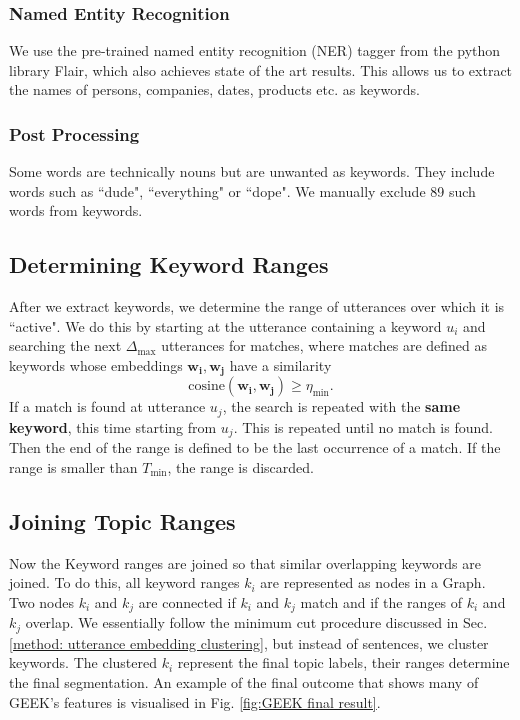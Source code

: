         \subsubsection{Named Entity Recognition}
            We use the pre-trained named entity recognition (NER) tagger from the python library Flair\cite{flairNLP}, which also achieves state of the art results. This allows us to extract the names of persons, companies, dates, products etc. as keywords.
        
        \subsubsection{Post Processing}
            Some words are technically nouns but are unwanted as keywords. They include words such as ``dude", ``everything" or ``dope". We manually exclude 89 such words from keywords.
        
    \subsection{Determining Keyword Ranges}
        After we extract keywords, we determine the range of utterances over which it is ``active". We do this by starting at the utterance containing a keyword $u_i$ and searching the next $\Delta_{\text{max}}$ utterances for matches, where matches are defined as keywords whose embeddings $\mathbf{w_i}, \mathbf{w_j}$ have a similarity
        \begin{equation}
            \text{cosine}(\mathbf{w_i}, \mathbf{w_j}) \geq \eta_{\text{min}}.
        \end{equation}
        If a match is found at utterance $u_j$, the search is repeated with the \textbf{same keyword}, this time starting from $u_j$. This is repeated until no match is found. Then the end of the range is defined to be the last occurrence of a match. If the range is smaller than $T_{\text{min}}$, the range is discarded. 
        
    \subsection{Joining Topic Ranges}
        Now the Keyword ranges are joined so that similar overlapping keywords are joined. To do this, all keyword ranges $k_i$ are represented as nodes in a Graph. Two nodes $k_i$ and $k_j$ are connected if $k_i$ and $k_j$ match and if the ranges of $k_i$ and $k_j$ overlap. We essentially follow the minimum cut procedure discussed in Sec. \ref{method: utterance embedding clustering}, but instead of sentences, we cluster keywords. The clustered $k_i$ represent the final topic labels, their ranges determine the final segmentation. An example of the final outcome that shows many of GEEK's features is visualised in Fig. \ref{fig:GEEK final result}.
        
